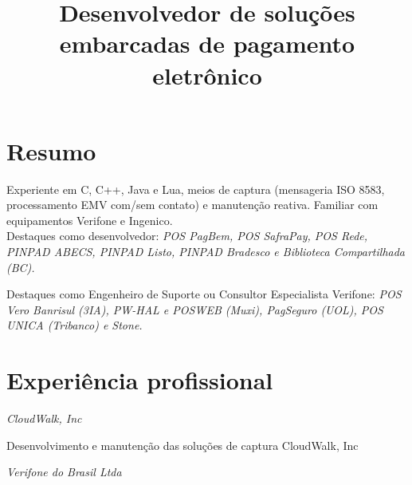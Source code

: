 \documentclass[11pt,a4paper,sans]{moderncv}
\title{\Large Desenvolvedor de soluções\protect\\embarcadas de pagamento eletrônico}
\begin{document}
\maketitle

\section{Resumo}

\vspace{1.5pt}

\hspace{1.25cm} Experiente em C, C++, Java e Lua, meios de captura (mensageria
ISO 8583, processamento EMV com/sem contato) e manutenção reativa. Familiar com
equipamentos Verifone e Ingenico.\protect\\

\hspace{1.25cm} Destaques como desenvolvedor: \textit{POS PagBem, POS SafraPay,
POS Rede, PINPAD ABECS, PINPAD Listo, PINPAD Bradesco e Biblioteca
Compartilhada (BC).}

\hspace{1.25cm} Destaques como Engenheiro de Suporte ou Consultor Especialista
Verifone: \textit{POS Vero Banrisul (3IA), PW-HAL e POSWEB (Muxi), PagSeguro
(UOL), POS UNICA (Tribanco) e Stone.}

\section{Experiência profissional}

\vspace{1.5pt}

\hspace{1.25cm} \textit{CloudWalk, Inc}


\hspace{1.25cm} \begin{minipage}[htb]{\linewidth - 1.25cm}
    Desenvolvimento e manutenção das soluções de captura CloudWalk, Inc
\end{minipage}

\vspace{\baselineskip}

\hspace{1.25cm} \textit{Verifone do Brasil Ltda}

\end{document}
